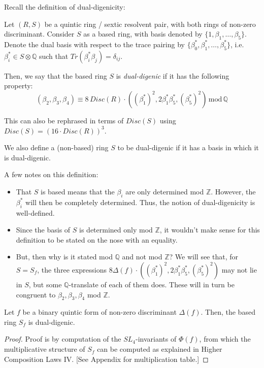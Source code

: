 \documentclass{report}
\begin{document}
Recall the definition of dual-digenicity:
\begin{definition} \label{dual digenic2}
Let $(R,S)$ be a quintic ring / sextic resolvent pair, with both rings of non-zero discriminant.  Consider $S$ as a based ring, with basis denoted by $\{1,\beta_1,\ldots,\beta_5\}$.  Denote the dual basis with respect to the trace pairing by $\{\beta_0^*,\beta_1^*,\ldots,\beta_5^*\}$, i.e. $\beta_i^* \in S \otimes \mathbb{Q}$ such that $Tr(\beta_i^* \beta_j) = \delta_{ij}$.

Then, we say that the based ring $S$ is \emph{dual-digenic} if it has the following property:
\begin{equation}
(\beta_2,\beta_3,\beta_4) \equiv 8 \, Disc(R) \cdot ( (\beta_1^*)^2, 2 \beta_1^* \beta_5^*, (\beta_5^*)^2 ) \, \text{mod} \, \mathbb{Q}
\end{equation}

This can also be rephrased in terms of $Disc(S)$ using $Disc(S) = (16 \cdot Disc(R))^3$.

We also define a (non-based) ring $S$ to be dual-digenic if it has a basis in which it is dual-digenic.
\end{definition}

A few notes on this definition:
\begin{itemize}
\item That $S$ is based means that the $\beta_i$ are only determined mod $\mathbb{Z}$.  However, the $\beta_i^*$ will then be completely determined.  Thus, the notion of dual-digenicity is well-defined.
\item Since the basis of $S$ is determined only mod $\mathbb{Z}$, it wouldn't make sense for this definition to be stated on the nose with an equality.
\item But, then why is it stated mod $\mathbb{Q}$ and not mod $\mathbb{Z}$?  We will see that, for $S = S_f$, the three expressions $8 \Delta(f) \cdot ((\beta_1^*)^2, 2 \beta_1^* \beta_5^*, (\beta_5^*)^2)$ may not lie in $S$, but some $\mathbb{Q}$-translate of each of them does.  These will in turn be congruent to $\beta_2, \beta_3, \beta_4$ mod $\mathbb{Z}$.
\end{itemize}


\begin{theorem} \label{sextic structure2}
Let $f$ be a binary quintic form of non-zero discriminant $\Delta(f)$.  Then, the based ring $S_f$ is dual-digenic.
\end{theorem}
\begin{proof}
Proof is by computation of the $SL_4$-invariants of $\Phi(f)$, from which the multiplicative structure of $S_f$ can be computed as explained in Higher Composition Laws IV.  [See Appendix for multiplication table.]
\end{proof}
\end{document}
